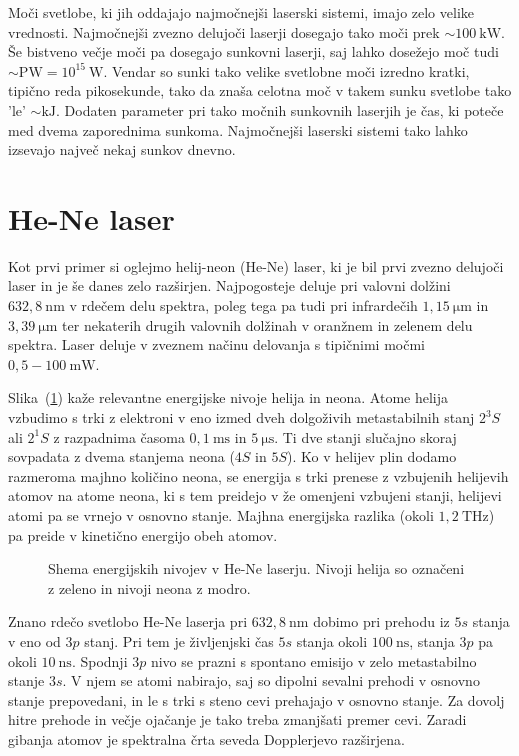 Moči svetlobe, ki jih oddajajo najmočnejši laserski sistemi, imajo zelo velike
vrednosti. Najmočnejši zvezno delujoči laserji dosegajo tako moči prek 
$\sim 100~\si{\kilo\watt}$. Še bistveno večje moči pa dosegajo sunkovni laserji, 
saj lahko dosežejo moč tudi $\sim \si{\peta\watt} = 10^{15}~\si{\watt}$. 
Vendar so sunki tako velike svetlobne moči izredno kratki, tipično reda pikosekunde, tako da
znaša celotna moč v takem sunku svetlobe tako 'le' $\sim \si{\kilo\joule}$. Dodaten 
parameter pri tako močnih sunkovnih laserjih je čas, ki poteče med dvema zaporednima
sunkoma. Najmočnejši laserski sistemi tako lahko izsevajo največ nekaj sunkov dnevno. 

\section{He-Ne laser}

Kot prvi primer si oglejmo helij-neon (He-Ne) laser, ki je bil prvi zvezno 
delujoči laser in je še danes zelo razširjen. Najpogosteje deluje 
pri valovni dolžini $632,8~\si{\nano\metre}$ v rdečem delu spektra, poleg 
tega pa tudi pri infrardečih $1,15~\si{\micro\metre}$ in 
$3,39~\si{\micro\metre}$ ter nekaterih drugih
valovnih dolžinah v oranžnem in zelenem delu spektra. Laser deluje v zveznem 
načinu delovanja s tipičnimi močmi $0,5 - 100~\si{\milli\watt}$.

Slika~(\ref{fig:HeNeE}) kaže relevantne energijske nivoje helija in neona. Atome helija
vzbudimo s trki z elektroni v eno izmed dveh dolgoživih metastabilnih stanj $2^3S$ ali
$2^1S$ z razpadnima časoma $0,1~\si{\milli\second}$ in $5~\si{\micro\second}$.
Ti dve stanji slučajno skoraj sovpadata z dvema stanjema neona ($4S$ in $5S$). 
Ko v helijev plin dodamo razmeroma majhno količino neona, se energija s trki 
prenese z vzbujenih helijevih atomov na atome neona, ki s tem preidejo v 
že omenjeni vzbujeni stanji, helijevi atomi pa se vrnejo v osnovno stanje. 
Majhna energijska razlika (okoli $1,2~\si{\tera\hertz}$) pa preide v
kinetično energijo obeh atomov. 
\begin{figure}[h]
\centering
\def\svgwidth{100truemm} 

\caption{Shema energijskih nivojev v He-Ne laserju. Nivoji helija so označeni
z zeleno in nivoji neona z modro.}
\label{fig:HeNeE}
\end{figure}

Znano rdečo svetlobo He-Ne laserja pri $632,8~\si{\nano\metre}$ dobimo 
pri prehodu iz $5s$ stanja v eno od $3p$ stanj. Pri tem je življenjski čas 
$5s$ stanja okoli $100~\si{\nano\second}$, stanja $3p$ pa okoli $10~\si{\nano\second}$.
Spodnji $3p$ nivo se prazni s spontano emisijo v zelo metastabilno stanje $3s$. 
V njem se atomi nabirajo, saj so dipolni sevalni prehodi v osnovno stanje prepovedani,
in le s trki s steno cevi prehajajo v osnovno stanje. Za dovolj hitre prehode in 
večje ojačanje je tako treba zmanjšati premer cevi. Zaradi gibanja atomov je 
spektralna črta seveda Dopplerjevo razširjena. 

